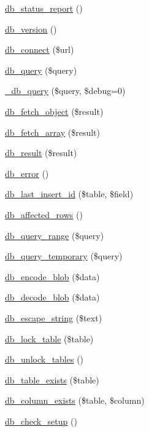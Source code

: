 \begin{CompactItemize}
\item 
\hyperlink{group__database_g0f08b7a80942b33cdc67eebc95e0ee6b}{db\_\-status\_\-report} ()
\item 
\hyperlink{group__database_g6736a6897048ff0167a0bbe5e374fc13}{db\_\-version} ()
\item 
\hyperlink{group__database_gbc9960ee403664deae1c219015dc5ff2}{db\_\-connect} (\$url)
\item 
\hyperlink{group__database_g9e096321b86945d128746ac7bedce8f3}{db\_\-query} (\$query)
\item 
\hyperlink{group__database_gf0a663e6a6aaf095f78a77c871b8028b}{\_\-db\_\-query} (\$query, \$debug=0)
\item 
\hyperlink{group__database_g5faaeba7105d28828db453b4fd3c75d4}{db\_\-fetch\_\-object} (\$result)
\item 
\hyperlink{group__database_g2bd5f98fec7f21ee2c37f6b83785dcb9}{db\_\-fetch\_\-array} (\$result)
\item 
\hyperlink{group__database_g953354ea01b236440b187210dc18aad9}{db\_\-result} (\$result)
\item 
\hyperlink{group__database_g5acae04a62f1baa2e83d189e72071bfe}{db\_\-error} ()
\item 
\hyperlink{group__database_g1d29b142caeee2f0f2217be16857b9ae}{db\_\-last\_\-insert\_\-id} (\$table, \$field)
\item 
\hyperlink{group__database_ge3bc677fbeebd688068ce3b413ac2944}{db\_\-affected\_\-rows} ()
\item 
\hyperlink{group__database_g893cbcab2ecf321005eae4e278adc22b}{db\_\-query\_\-range} (\$query)
\item 
\hyperlink{group__database_gbce8dcddcded20016a1925824cd09efa}{db\_\-query\_\-temporary} (\$query)
\item 
\hyperlink{group__database_g464ab7b26ecfdddc68f3564ca609ac3f}{db\_\-encode\_\-blob} (\$data)
\item 
\hyperlink{group__database_g1ed4215d202290ca055de8f6cf3b6f08}{db\_\-decode\_\-blob} (\$data)
\item 
\hyperlink{group__database_gf7e6977f59f6a23327521ae3a89346f5}{db\_\-escape\_\-string} (\$text)
\item 
\hyperlink{group__database_g8584042b05393a82b7d06c2ee6cf95ed}{db\_\-lock\_\-table} (\$table)
\item 
\hyperlink{group__database_g827df02252c1d606c685b768807b7181}{db\_\-unlock\_\-tables} ()
\item 
\hyperlink{group__database_g78809300cee80db034832825aed55b70}{db\_\-table\_\-exists} (\$table)
\item 
\hyperlink{group__database_g3d649bb8d8b9a7222c0bded9d7e2785a}{db\_\-column\_\-exists} (\$table, \$column)
\item 
\hyperlink{group__database_g7ba830a719ea0847a983f70ade811880}{db\_\-check\_\-setup} ()
\end{CompactItemize}


